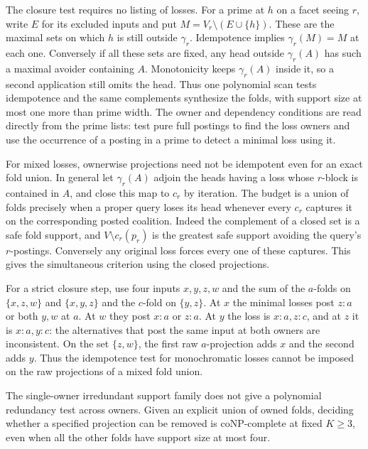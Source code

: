 The closure test requires no listing of losses. For a
prime at $h$ on a facet seeing $r$, write $E$ for its
excluded inputs and put $M=V_r\setminus(E\cup\{h\})$.
These are the maximal sets on which $h$ is still outside
$\gamma_r$. Idempotence implies $\gamma_r(M)=M$ at each
one. Conversely if all these sets are fixed, any head
outside $\gamma_r(A)$ has such a maximal avoider containing
$A$. Monotonicity keeps $\gamma_r(A)$ inside it, so a second
application still omits the head. Thus one polynomial scan
tests idempotence and the same complements synthesize the
folds, with support size at most one more than prime width.
The owner and dependency conditions are read directly from
the prime lists: test pure full postings to find the loss
owners and use the occurrence of a posting in a prime to
detect a minimal loss using it.

For mixed losses, ownerwise projections need not be idempotent
even for an exact fold union. In general let $\gamma_r(A)$
adjoin the heads having a loss whose $r$-block is contained
in $A$, and close this map to $c_r$ by iteration. The budget
is a union of folds precisely when a proper query loses its head
whenever every $c_r$ captures it on the corresponding posted
coalition. Indeed the complement of a closed set is a safe
fold support, and $V\setminus c_r(p_r)$ is the greatest safe
support avoiding the query's $r$-postings. Conversely any
original loss forces every one of these captures. This gives
the simultaneous criterion using the closed projections.

For a strict closure step, use four inputs $x,y,z,w$ and the
sum of the $a$-folds on $\{x,z,w\}$ and $\{x,y,z\}$ and the
$c$-fold on $\{y,z\}$. At $x$ the minimal losses post $z:a$
or both $y,w$ at $a$. At $w$ they post $x:a$ or $z:a$.
At $y$ the loss is $x:a,z:c$, and at $z$ it is $x:a,y:c$:
the alternatives that post the same input at both owners
are inconsistent. On the set $\{z,w\}$, the first raw
$a$-projection adds $x$ and the second adds $y$. Thus the
idempotence test for monochromatic losses cannot be imposed
on the raw projections of a mixed fold union.

The single-owner irredundant support family does
not give a polynomial redundancy test across owners.
Given an explicit union of owned folds, deciding
whether a specified projection can be removed is
coNP-complete at fixed $K\ge3$, even when all the
other folds have support size at most four.

